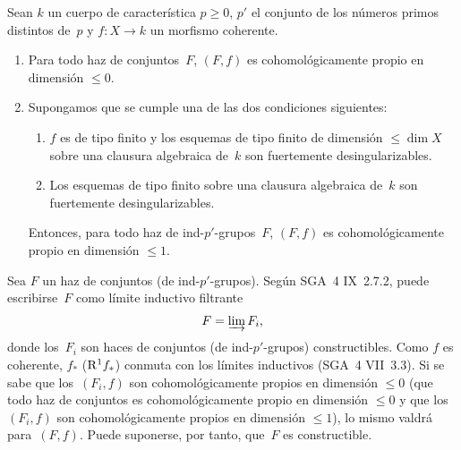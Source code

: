 \shorthandoff{<>}%

\begin{corollaire}
\label{XIII.3.2}
Sean $k$ un cuerpo de característica $p\geq 0$, $p'$ el conjunto de los
números primos distintos de~$p$ y $f\colon X\to k$ un morfismo coherente.
\begin{enumerate}
\item[1)] Para todo haz de conjuntos~$F$, $(F,f)$ es cohomológicamente
propio en dimensión $\leqslant 0$.
\item[2)] Supongamos que se cumple una de las dos condiciones siguientes:
\begin{enumerate}
\item[a)] $f$ es de tipo finito y los esquemas de tipo finito de dimensión
$\leqslant\dim X$ sobre una clausura algebraica de~$k$ son fuertemente
desingularizables.
\item[b)] Los esquemas de tipo finito sobre una clausura algebraica de~$k$
son
fuertemente desingularizables.
\end{enumerate}
Entonces, para todo haz de ind-$p'$-grupos~$F$, $(F,f)$ es
cohomológicamente propio en dimensión $\leqslant 1$.
\end{enumerate}
\end{corollaire}

Sea $F$ un haz de conjuntos (\resp de ind-$p'$-grupos). Según
SGA~4 IX~2.7.2, puede escribirse~$F$ como límite inductivo filtrante
$$
F=\varinjlim F_i,
$$
donde los~$F_i$ son haces de conjuntos (\resp de ind-$p'$-grupos)
constructibles. Como $f$ es coherente, $f_*$ (\resp $\mathrm{R}^1f_*$) conmuta
con los límites inductivos (SGA~4 VII~3.3). Si se sabe que los~$(F_i,f)$
son cohomológicamente propios en dimensión $\leqslant 0$ (\resp que todo
haz de conjuntos es cohomológicamente propio en dimensión $\leqslant 0$
y que los~$(F_i,f)$ son cohomológicamente propios en dimensión
$\leqslant 1$), lo mismo valdrá para~$(F,f)$. Puede suponerse, por tanto,
que~$F$ es constructible.

